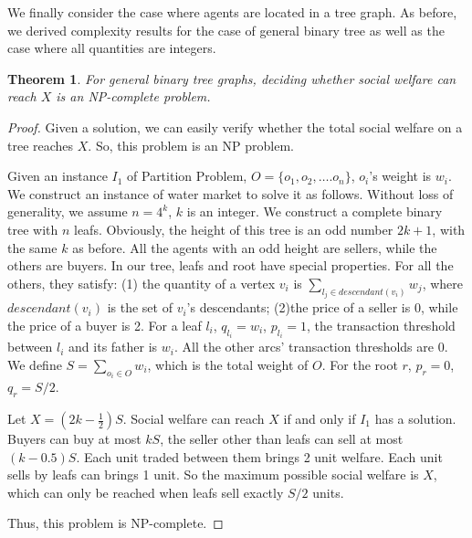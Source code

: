 \documentclass{aamas2015}
\newtheorem{theorem}{Theorem}%
\newtheorem{definition}{Definition}
\begin{document}
We finally consider the case where agents are located in a tree graph. As before, we derived complexity results for the case of general binary tree as well as the case where all quantities are integers.


\begin{theorem}\label{thm:tree}
	For general binary tree graphs, deciding whether social welfare can reach $X$ is an {\sc NP-complete} problem.
\end{theorem}

\begin{proof}
Given a solution, we can easily verify whether the total social welfare on a tree reaches $X$.
So, this problem is an NP problem.

Given an instance $I_1$ of {\sc Partition Problem}, $O=\{o_1,o_2,\ldots. o_n\}$,  $o_i$'s weight is $w_i$.
We construct an instance of water market to solve it as follows.
Without loss of generality, we assume $n=4^k$, $k$ is an integer.
We construct a complete binary tree with $n$ leafs.
Obviously, the height of this tree is an odd number $2k+1$, with the same $k$ as before.
All the agents with an odd height are sellers, while the others are buyers.
In our tree, leafs and root have special properties.
For all the others, they satisfy: (1) the quantity of a vertex $v_i$ is $\sum_{l_j\in descendant(v_i)}w_j$, where $descendant(v_i)$ is the set of $v_i$'s descendants; (2)the price of a seller is 0, while the price of a buyer is 2.
For a leaf $l_i$, $q_{l_i}=w_i$, $p_{l_i}=1$, the transaction threshold between $l_i$ and its father is $w_i$.
All the other arcs' transaction thresholds are $0$.
We define $S=\sum_{o_i\in O}w_i$, which is the total weight of $O$.
For the root $r$, $p_r=0$, $q_r=S/2$.

Let $X=(2k-\frac{1}{2})S$.
Social welfare can reach $X$ if and only if $I_1$ has a solution.
Buyers can buy at most $kS$, the seller other than leafs can sell at most $(k-0.5)S$.
Each unit traded between them brings 2 unit welfare.
Each unit sells by leafs can  brings 1 unit.
So the maximum possible social welfare is $X$, which can only be reached when leafs sell exactly $S/2$ units.

Thus, this problem is {\sc NP-complete}.
\end{proof}
%
%
%
\end{document}
